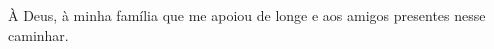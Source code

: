 \vspace*{\fill}
\hspace{.45\textwidth} %
    \begin{minipage}{.5\textwidth}
    \flushright
    
    À Deus, à minha família que me apoiou de longe e aos amigos presentes nesse caminhar.
    
    \end{minipage}
